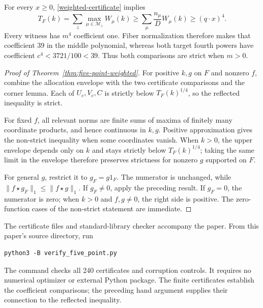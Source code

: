 For every $x\ge0$, \eqref{weighted-certificate} implies
\[
 T_F(k)=\sum_z\max_{\mu\in\mathcal M_z}W_\mu(k)
 \ge\sum_\mu\frac{n_\mu}{D}W_\mu(k)
 \ge(q\cdot x)^4.
\]
Every witness has $m^4$ coefficient one. Fiber normalization therefore
makes that coefficient 39 in the middle polynomial, whereas both target
fourth powers have coefficient $c^4<3721/100<39$. Thus both comparisons
are strict when $m>0$.

\begin{proof}[Proof of Theorem~\ref{thm:five-point-weighted}]
For positive $k,g$ on $F$ and nonzero $f$, combine the allocation
envelope with the two certificate comparisons and the corner lemma.
Each of $U_c,V_c,C$ is strictly below $T_F(k)^{1/4}$, so the
reflected inequality is strict.

For fixed $f$, all relevant norms are finite sums of maxima of finitely
many coordinate products, and hence continuous in $k,g$. Positive
approximation gives the non-strict inequality when some coordinates
vanish. When $k>0$, the upper envelope depends only on $k$ and stays
strictly below $T_F(k)^{1/4}$; taking the same limit in the envelope
therefore preserves strictness for nonzero $g$ supported on $F$.

For general $g$, restrict it to $g_F=g1_F$. The numerator is unchanged,
while $\|f\star g_F\|_1\le\|f\star g\|_1$. If $g_F\ne0$, apply
the preceding result. If $g_F=0$, the numerator is zero; when $k>0$
and $f,g\ne0$, the right side is positive. The zero-function cases
of the non-strict statement are immediate.
\end{proof}

The certificate files and standard-library checker accompany the paper.
From this paper's source directory, run
\begin{verbatim}
python3 -B verify_five_point.py
\end{verbatim}
The command checks all 240 certificates and corruption controls. It
requires no numerical optimizer or external Python package. The finite
certificates establish the coefficient comparisons; the preceding hand
argument supplies their connection to the reflected inequality.
